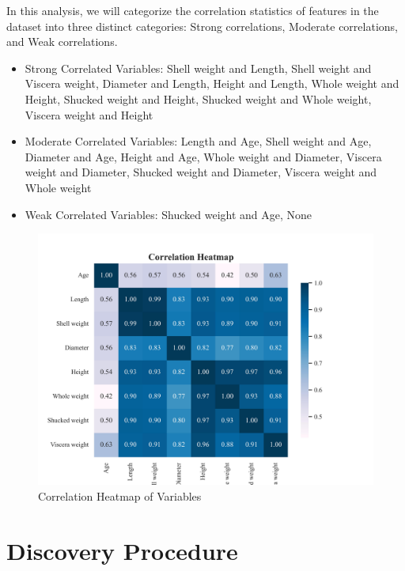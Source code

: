 \documentclass{article}
\begin{document}
\begin{minipage}[t]{0.5\linewidth}
In this analysis, we will categorize the correlation statistics of features in the dataset into three distinct categories: Strong correlations, Moderate correlations, and Weak correlations.

\begin{itemize}
\item Strong Correlated Variables: Shell weight and Length, Shell weight and Viscera weight, Diameter and Length, Height and Length, Whole weight and Height, Shucked weight and Height, Shucked weight and Whole weight, Viscera weight and Height
\item Moderate Correlated Variables: Length and Age, Shell weight and Age, Diameter and Age, Height and Age, Whole weight and Diameter, Viscera weight and Diameter, Shucked weight and Diameter, Viscera weight and Whole weight
\item Weak Correlated Variables: Shucked weight and Age, None
\end{itemize}
\vfill
\end{minipage}
\hfill
\begin{minipage}[t]{0.5\linewidth}
\begin{figure}[H]
\centering
\vspace{-1.5cm}
\includegraphics[width=\linewidth]{./demo_data/20241104_121546/Abalone/output_graph/eda_corr.jpg}
\caption{\label{fig:corr}Correlation Heatmap of Variables}
\end{figure}
\end{minipage}

\section{Discovery Procedure}
\end{document}

